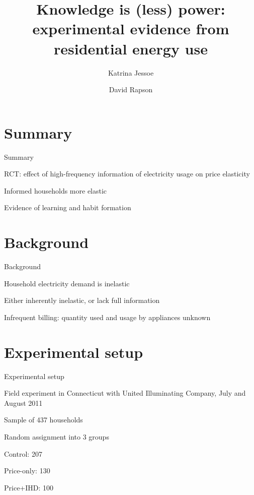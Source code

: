 \documentclass[aspectratio=169]{beamer}
\title[Your Short Title]{Knowledge is (less) power: experimental evidence from residential energy use}
\author{Katrina Jessoe \and David Rapson}
\date{}
\newenvironment{wideitemize}{\itemize\addtolength{\itemsep}{10pt}}{\enditemize}
\begin{document}
\begin{frame}
    \titlepage
\end{frame}

\section{Summary}
\begin{frame}{Summary}
    \begin{wideitemize}
        \item RCT: effect of high-frequency information of electricity usage on price elasticity
        \item Informed households more elastic
        \item Evidence of learning and habit formation
    \end{wideitemize}
\end{frame}


\section{Background}
\begin{frame}{Background}
    \begin{wideitemize}
        \item Household electricity demand is inelastic
        \item Either inherently inelastic, or lack full information
        \item Infrequent billing: quantity used and usage by appliances unknown
    \end{wideitemize}
\end{frame}

\section{Experimental setup}
\begin{frame}{Experimental setup}
    \begin{wideitemize}
        \item Field experiment in Connecticut with United Illuminating Company, July and August 2011
        \item Sample of 437 households
        \item Random assignment into 3 groups
            \begin{wideitemize}
                \item Control: 207
                \item Price-only: 130
                \item Price+IHD: 100
            \end{wideitemize}
    \end{wideitemize}
\end{frame}
\end{document}
